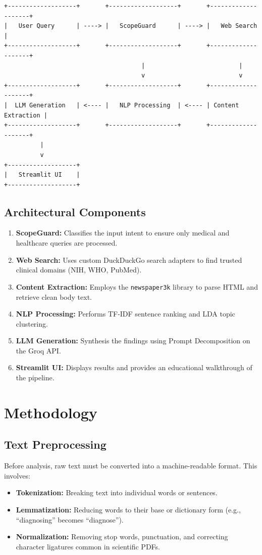 \documentclass[12pt,a4paper]{article}
\begin{document}
\begin{verbatim}
+-------------------+       +-------------------+       +--------------------+
|   User Query      | ----> |   ScopeGuard      | ----> |   Web Search       |
+-------------------+       +-------------------+       +--------------------+
                                      |                          |
                                      v                          v
+-------------------+       +-------------------+       +--------------------+
|  LLM Generation   | <---- |   NLP Processing  | <---- | Content Extraction |
+-------------------+       +-------------------+       +--------------------+
          |
          v
+-------------------+
|   Streamlit UI    |
+-------------------+
\end{verbatim}

\subsection{Architectural Components}
\begin{enumerate}
    \item \textbf{ScopeGuard:} Classifies the input intent to ensure only medical and healthcare queries are processed.
    \item \textbf{Web Search:} Uses custom DuckDuckGo search adapters to find trusted clinical domains (NIH, WHO, PubMed).
    \item \textbf{Content Extraction:} Employs the \texttt{newspaper3k} library to parse HTML and retrieve clean body text.
    \item \textbf{NLP Processing:} Performs TF-IDF sentence ranking and LDA topic clustering.
    \item \textbf{LLM Generation:} Synthesis the findings using Prompt Decomposition on the Groq API.
    \item \textbf{Streamlit UI:} Displays results and provides an educational walkthrough of the pipeline.
\end{enumerate}

\section{Methodology}

\subsection{Text Preprocessing}
Before analysis, raw text must be converted into a machine-readable format. This involves:
\begin{itemize}
    \item \textbf{Tokenization:} Breaking text into individual words or sentences.
    \item \textbf{Lemmatization:} Reducing words to their base or dictionary form (e.g., ``diagnosing'' becomes ``diagnose'').
    \item \textbf{Normalization:} Removing stop words, punctuation, and correcting character ligatures common in scientific PDFs.
\end{itemize}
\end{document}
